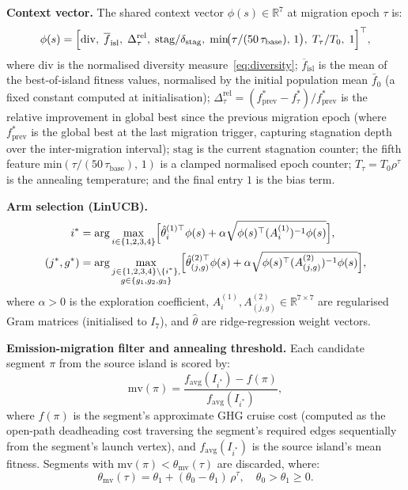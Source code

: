 \documentclass[a4paper,fleqn]{cas-dc}
\begin{document}
\textbf{Context vector.}
The shared context vector $\phi(s) \in \mathbb{R}^7$ at migration epoch $\tau$ is:
\begin{equation}\label{eq:context}
\phi(s) = \Bigl[
 \mathrm{div},\;
 \overline{f}_{\mathrm{isl}},\;
 \Delta^{\mathrm{rel}}_\tau,\;
 \mathrm{stag} / \delta_{\mathrm{stag}},\;
 \min\!\bigl(\tau / (50\,\tau_{\mathrm{base}}),\,1\bigr),\;
 T_\tau / T_0,\;
 1
\Bigr]^\top,
\end{equation}
where $\mathrm{div}$ is the normalised diversity measure~\eqref{eq:diversity}; $\overline{f}_{\mathrm{isl}}$ is the mean of the best-of-island fitness values, normalised by the initial population mean $\bar{f}_0$ (a fixed constant computed at initialisation); $\Delta^{\mathrm{rel}}_\tau = (f^*_{\mathrm{prev}} - f^*_\tau) / f^*_{\mathrm{prev}}$ is the relative improvement in global best since the previous migration epoch (where $f^*_{\mathrm{prev}}$ is the global best at the last migration trigger, capturing stagnation depth over the inter-migration interval); $\mathrm{stag}$ is the current stagnation counter; the fifth feature min$(\tau/(50\,\tau_{\mathrm{base}}),\,1)$ is a clamped normalised epoch counter; $T_\tau = T_0 \rho^\tau$ is the annealing temperature; and the final entry $1$ is the bias term.

\textbf{Arm selection (LinUCB).}
\begin{align}
 i^* &= \arg\max_{i \in \{1,2,3,4\}} \Bigl[
 \hat{\theta}^{(1)\top}_i \phi(s)
 + \alpha \sqrt{\phi(s)^\top (A^{(1)}_i)^{-1} \phi(s)}
 \Bigr], \label{eq:linucb1} \\
 (j^*, g^*) &= \arg\max_{\substack{j \in \{1,2,3,4\} \setminus \{i^*\},\\
    g \in \{g_1,g_2,g_3\}}} \Bigl[
 \hat{\theta}^{(2)\top}_{(j,g)} \phi(s)
 + \alpha \sqrt{\phi(s)^\top (A^{(2)}_{(j,g)})^{-1} \phi(s)}
 \Bigr], \label{eq:linucb2}
\end{align}
where $\alpha > 0$ is the exploration coefficient, $A^{(1)}_i, A^{(2)}_{(j,g)} \in \mathbb{R}^{7 \times 7}$ are regularised Gram matrices (initialised to $I_7$), and $\hat\theta$ are ridge-regression weight vectors.

\textbf{Emission-migration filter and annealing threshold.}
Each candidate segment $\pi$ from the source island is scored by:
\begin{equation}\label{eq:filter}
 \mathrm{mv}(\pi) = \frac{f_{\mathrm{avg}}(I_{i^*}) - f(\pi)}{f_{\mathrm{avg}}(I_{i^*})},
\end{equation}
where $f(\pi)$ is the segment's approximate GHG cruise cost (computed as the open-path deadheading cost traversing the segment's required edges sequentially from the segment's launch vertex), and $f_{\mathrm{avg}}(I_{i^*})$ is the source island's mean fitness. Segments with $\mathrm{mv}(\pi) < \theta_{\mathrm{mv}}(\tau)$ are discarded, where:
\begin{equation}\label{eq:threshold}
 \theta_{\mathrm{mv}}(\tau) = \theta_1 + (\theta_0 - \theta_1)\,\rho^\tau, \quad
 \theta_0 > \theta_1 \geq 0.
\end{equation}
\end{document}

